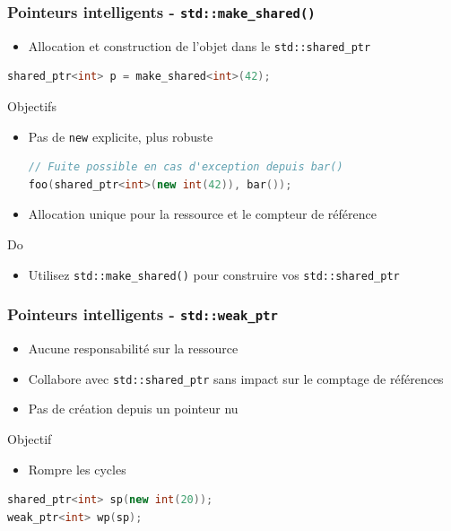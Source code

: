 \documentclass[C++.tex]{subfiles}
\begin{document}
\begin{frame}[fragile]
	\frametitle{Pointeurs intelligents - \lstinline|std::make_shared()|}
	\begin{itemize}
		\item Allocation et construction de l'objet dans le \lstinline|std::shared_ptr|
	\end{itemize}

	\begin{lstlisting}[language=C++]
shared_ptr<int> p = make_shared<int>(42);\end{lstlisting}

	\begin{block}{Objectifs}
		\begin{itemize}
			\item Pas de \lstinline|new| explicite, plus robuste


			\begin{lstlisting}[language=C++]
// Fuite possible en cas d'exception depuis bar()
foo(shared_ptr<int>(new int(42)), bar());\end{lstlisting}

			\item Allocation unique pour la ressource et le compteur de référence
		\end{itemize}
	\end{block}

	\begin{exampleblock}{Do}
		\begin{itemize}
			\item Utilisez \lstinline|std::make_shared()| pour construire vos \lstinline|std::shared_ptr|
		\end{itemize}
	\end{exampleblock}
\end{frame}

\begin{frame}[fragile]
	\frametitle{Pointeurs intelligents - \lstinline|std::weak_ptr|}
	\begin{itemize}
		\item Aucune responsabilité sur la ressource
		\item Collabore avec \lstinline|std::shared_ptr| sans impact sur le comptage de références
		\item Pas de création depuis un pointeur nu
	\end{itemize}

	\begin{block}{Objectif}
		\begin{itemize}
			\item Rompre les cycles 
		\end{itemize}
	\end{block}

	\begin{lstlisting}[language=C++]
shared_ptr<int> sp(new int(20));
weak_ptr<int> wp(sp);\end{lstlisting}
\end{frame}
\end{document}
